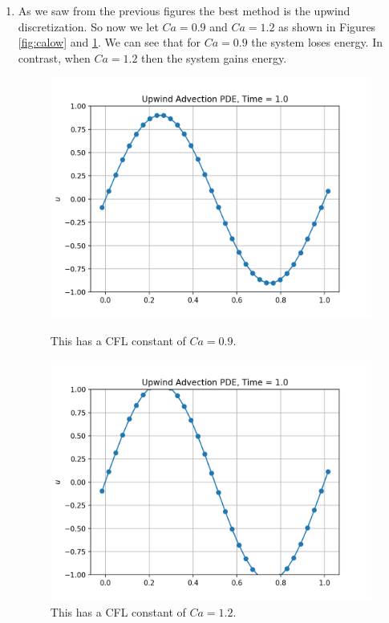 \documentclass[12pt]{article}
\begin{document}
\begin{enumerate}[label=(\alph*)]
	
	\item As we saw from the previous figures the best method is the upwind discretization. So now we let $Ca = 0.9$ and $Ca = 1.2$ as shown in Figures \ref{fig:calow} and \ref{fig:cahigh}. We can see that for $Ca = 0.9$ the system loses energy. In contrast, when $Ca = 1.2$ then the system gains energy. 
	\newpage
	\begin{figure}[htb]
		\centering
		\begin{minipage}[c]{0.48\textwidth}
			\centering
			\includegraphics[width=0.7\linewidth]{./PDE/figures/plotsforg/result_advection_32_upwind_1_lowCa.png}
			\caption{This has a CFL constant of $Ca = 0.9$.}
			\label{fig:calow}
		\end{minipage}
		\hspace{0.1in}
		\begin{minipage}[c]{0.48\textwidth}
			\centering
			\includegraphics[width=0.7\linewidth]{./PDE/figures/plotsforg/result_advection_32_upwind_1_highCa.png}
			\caption{This has a CFL constant of $Ca = 1.2$.}
			\label{fig:cahigh}
		\end{minipage}
		\newline
		\vspace{-0.2in}
	\end{figure}
	

\end{enumerate}
\end{document}
